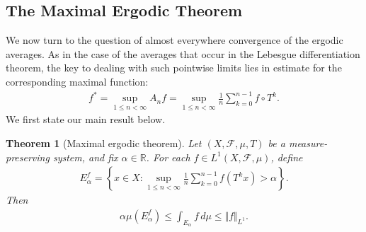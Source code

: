 \documentclass{article}
\numberwithin{equation}{section}
\newcommand{\bbR}{\mathbb{R}}
\newcommand{\scr}{\mathscr}
\theoremstyle{plain}
\newtheorem{theorem}{Theorem}[section]
\theoremstyle{definition}
\begin{document}
\subsection{The Maximal Ergodic Theorem}
We now turn to the question of almost everywhere convergence of the
ergodic averages. As in the case of the averages that occur in the Lebesgue differentiation theorem, the key to dealing with such pointwise
limits lies in estimate for the corresponding maximal function:
\begin{align*}
	f^*=\sup_{1\leq n<\infty}A_nf=\sup_{1\leq n<\infty}\frac{1}{n}\sum_{k=0}^{n-1}f\circ T^k.
\end{align*}
We first state our main result below.
\begin{theorem}[Maximal ergodic theorem]\label{maxerg}
Let $(X,\scr{F},\mu,T)$ be a measure-preserving system, and fix $\alpha\in\bbR$. For each $f\in L^1(X,\scr{F},\mu)$, define
\begin{align*}
	E_\alpha^f=\left\{x\in X:\sup_{1\leq n<\infty}\frac{1}{n}\sum_{k=0}^{n-1}f(T^k x)>\alpha\right\}.
\end{align*}
Then
\begin{align*}
	\alpha\mu(E_\alpha^f)\leq\int_{E_\alpha} f\,d\mu\leq\Vert f\Vert_{L^1}.
\end{align*}
\end{theorem}
\end{document}
